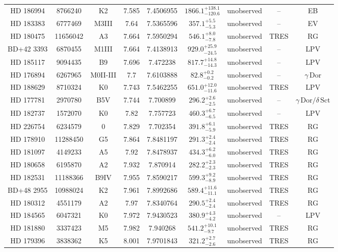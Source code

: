 \begin{table*}
\begin{tabular}{ccccccccc}
HD 186994 & 8766240 & K2 & 7.585 & 7.4506955 & $1866.1^{+138.1}_{-120.6}$ & unobserved & -- & EB \\
HD 183383 & 6777469 & M3III & 7.64 & 7.5365596 & $357.1^{+5.5}_{-5.3}$ & unobserved & -- & EV \\
HD 180475 & 11656042 & A3 & 7.664 & 7.5950294 & $546.1^{+8.0}_{-7.8}$ & unobserved & TRES & RG \\
BD+42 3393 & 6870455 & M1III & 7.664 & 7.4138913 & $929.0^{+25.9}_{-24.5}$ & unobserved & -- & LPV \\
HD 185117 & 9094435 & B9 & 7.696 & 7.472238 & $817.7^{+14.8}_{-14.3}$ & unobserved & -- & LPV \\
HD 176894 & 6267965 & M0II-III & 7.7 & 7.6103888 & $82.8^{+0.2}_{-0.2}$ & unobserved & -- & $\gamma\,\text{Dor}$ \\
HD 188629 & 8710324 & K0 & 7.743 & 7.5462255 & $651.0^{+12.0}_{-11.6}$ & unobserved & TRES & LPV \\
HD 177781 & 2970780 & B5V & 7.744 & 7.700899 & $296.2^{+2.6}_{-2.5}$ & unobserved & -- & $\gamma\,\text{Dor} /\delta\,\text{Sct}$ \\
HD 182737 & 1572070 & K0 & 7.82 & 7.757723 & $460.3^{+6.7}_{-6.5}$ & unobserved & -- & LPV \\
HD 226754 & 6234579 & 0 & 7.829 & 7.702354 & $391.8^{+6.1}_{-5.9}$ & unobserved & TRES & RG \\
HD 178910 & 11288450 & G5 & 7.864 & 7.8481197 & $291.3^{+2.4}_{-2.4}$ & unobserved & TRES & RG \\
HD 181097 & 4149233 & A5 & 7.92 & 7.8478937 & $434.3^{+6.2}_{-6.0}$ & unobserved & TRES & RG \\
HD 180658 & 6195870 & A2 & 7.932 & 7.870914 & $282.2^{+2.3}_{-2.3}$ & unobserved & TRES & RG \\
HD 182531 & 11188366 & B9IV & 7.955 & 7.8590217 & $599.3^{+9.2}_{-8.9}$ & unobserved & TRES & RG \\
BD+48 2955 & 10988024 & K2 & 7.961 & 7.8992686 & $589.4^{+11.6}_{-11.1}$ & unobserved & TRES & RG \\
HD 180312 & 4551179 & A2 & 7.97 & 7.8340764 & $290.5^{+2.4}_{-2.4}$ & unobserved & TRES & RG \\
HD 184565 & 6047321 & K0 & 7.972 & 7.9430523 & $380.9^{+4.3}_{-4.2}$ & unobserved & -- & LPV \\
HD 181880 & 3337423 & M5 & 7.982 & 7.940268 & $541.2^{+10.1}_{-9.7}$ & unobserved & TRES & RG \\
HD 179396 & 3838362 & K5 & 8.001 & 7.9701843 & $321.2^{+2.7}_{-2.6}$ & unobserved & TRES & RG \\

\end{tabular}
\end{table*}
